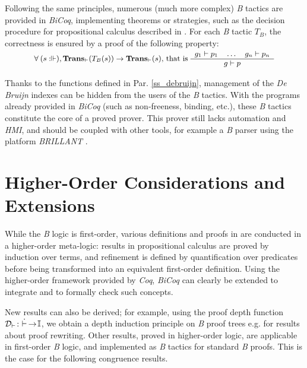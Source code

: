 \documentclass{llncs}
\begin{document}
Following the same principles, numerous (much more complex) \emph{B} tactics are provided in 
\emph{BiCoq}, implementing theorems or strategies, such as the decision procedure for 
propositional calculus described in \cite{abr:1}. For each \emph{B} tactic $T_B$, the 
correctness is ensured by a proof of the following property:
\[
\small
\begin{array}{l}
\vspace{-16pt}\\
\forall\:(s:\Vdash), \Bcmd{Trans_\vdash}(T_B(s))\to\Bcmd{Trans_\vdash}(s)
\text{, that is }
\begin{array}{c}
g_1 \vdash p_1\quad\ldots\quad g_n \vdash p_n\\\hline g \vdash p
\end{array}
\end{array}
\]

Thanks to the functions defined in Par. \ref{ss_debruijn}, management of the \emph{De Bruijn}
indexes can be hidden from the users of the \emph{B} tactics. With the programs already 
provided in \emph{BiCoq} (such as non-freeness, binding, etc.), these \emph{B} tactics 
constitute the core of a proved prover. This prover still lacks automation and \emph{HMI}, and 
should be coupled with other tools, for example a \emph{B} parser using the platform \emph{BRILLANT} \cite{sco:1}.

\section{Higher-Order Considerations and Extensions}\label{sc_extend}

While the \emph{B} logic is first-order, various definitions and proofs in \cite{abr:1} are 
conducted in a higher-order meta-logic: results in propositional calculus are proved by 
induction over terms, and refinement is defined by quantification over predicates before being 
transformed into an equivalent first-order definition. Using the higher-order framework
provided by \emph{Coq}, \emph{BiCoq} can clearly be extended to integrate and to formally check
such concepts.

New results can also be derived; for example, using the proof depth function
$\mathcal{D}_{\vdash}\!:\!\:\dot{\vdash}\:\!\!\to\!\mathbb{I}$, we obtain a depth induction principle on \emph{B} 
proof trees e.g. for results about proof rewriting. Other results, proved in higher-order 
logic, are applicable in first-order \emph{B} logic, and implemented as \emph{B} tactics for 
standard \emph{B} proofs. This is the case for the following congruence results.
\end{document}
